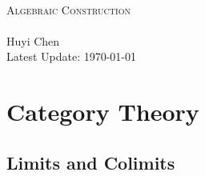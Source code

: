 \documentclass{report}
\begin{document}
\begin{center}
	~\\
	\vspace{6em}
	{\fontsize{34}{48}\selectfont\textsc{Algebraic Construction}}
	~\\
	\vspace{2.5em}
	{\Large }
	~\\
	\vspace{6em}
	\textsf{\Large Huyi Chen}
	~\\
	\vspace{5in}
	{\large Latest Update: \today}
\end{center}

\makeatletter
\MHInternalSyntaxOn
\def\MT_leftarrow_fill:{%
  \arrowfill@\leftarrow\relbar\relbar}
\def\MT_rightarrow_fill:{%
  \arrowfill@\relbar\relbar\rightarrow}
\newcommand{\xrightleftarrows}[2][]{\mathrel{%
  \raise.55ex\hbox{%
    $\ext@arrow 0359\MT_rightarrow_fill:{\phantom{#1}}{#2}$}%
  \setbox0=\hbox{%
    $\ext@arrow 3095\MT_leftarrow_fill:{#1}{\phantom{#2}}$}%
  \kern-\wd0 \lower.55ex\box0}}
\MHInternalSyntaxOff
\makeatother
\newcommand{\spec}{\operatorname{Spec}}
\newcommand{\midv}{\,\middle\vert\,}
\newpage
\tableofcontents


\chapter{Category Theory}
\section{Limits and Colimits}
\end{document}
